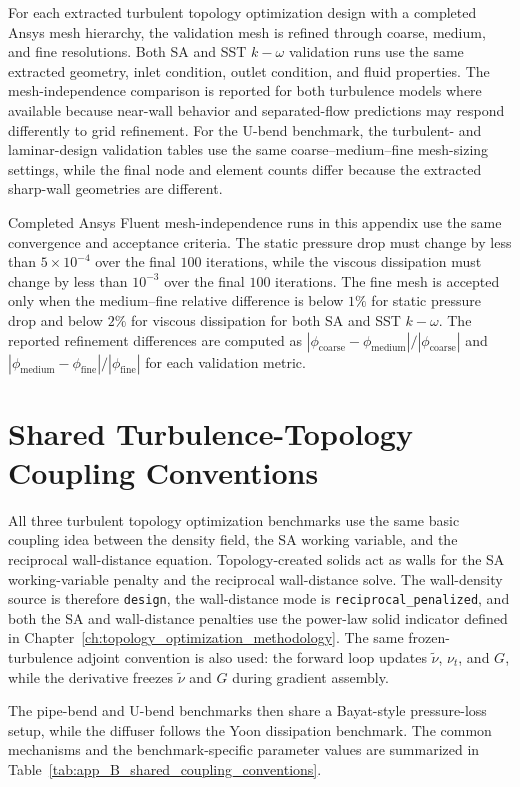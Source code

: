For each extracted turbulent topology optimization design with a completed Ansys mesh hierarchy, the validation mesh is refined through coarse, medium, and fine resolutions. Both SA and SST $k-\omega$ validation runs use the same extracted geometry, inlet condition, outlet condition, and fluid properties. The mesh-independence comparison is reported for both turbulence models where available because near-wall behavior and separated-flow predictions may respond differently to grid refinement. For the U-bend benchmark, the turbulent- and laminar-design validation tables use the same coarse--medium--fine mesh-sizing settings, while the final node and element counts differ because the extracted sharp-wall geometries are different.

Completed Ansys Fluent mesh-independence runs in this appendix use the same convergence and acceptance criteria. The static pressure drop must change by less than $5\times10^{-4}$ over the final $100$ iterations, while the viscous dissipation must change by less than $10^{-3}$ over the final $100$ iterations. The fine mesh is accepted only when the medium--fine relative difference is below $1\%$ for static pressure drop and below $2\%$ for viscous dissipation for both SA and SST $k-\omega$. The reported refinement differences are computed as $|\phi_{\mathrm{coarse}}-\phi_{\mathrm{medium}}|/|\phi_{\mathrm{coarse}}|$ and $|\phi_{\mathrm{medium}}-\phi_{\mathrm{fine}}|/|\phi_{\mathrm{fine}}|$ for each validation metric.

\section{Shared Turbulence-Topology Coupling Conventions}
\label{sec:app_B_shared_coupling_conventions}
All three turbulent topology optimization benchmarks use the same basic coupling idea between the density field, the SA working variable, and the reciprocal wall-distance equation. Topology-created solids act as walls for the SA working-variable penalty and the reciprocal wall-distance solve. The wall-density source is therefore \texttt{design}, the wall-distance mode is \texttt{reciprocal\_penalized}, and both the SA and wall-distance penalties use the power-law solid indicator defined in Chapter~\ref{ch:topology_optimization_methodology}. The same frozen-turbulence adjoint convention is also used: the forward loop updates $\tilde{\nu}$, $\nu_t$, and $G$, while the derivative freezes $\tilde{\nu}$ and $G$ during gradient assembly.

The pipe-bend and U-bend benchmarks then share a Bayat-style pressure-loss setup, while the diffuser follows the Yoon dissipation benchmark. The common mechanisms and the benchmark-specific parameter values are summarized in Table~\ref{tab:app_B_shared_coupling_conventions}.

